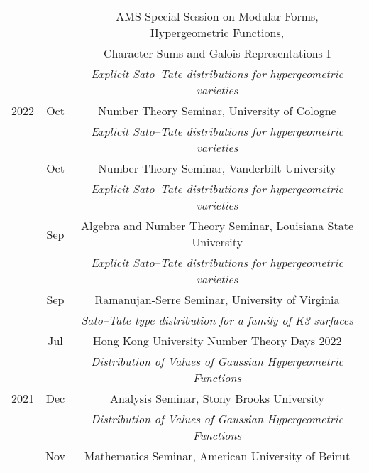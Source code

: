 \documentclass[11pt]{amsart}
\theoremstyle{remark}
\begin{document}
{\begin{tabular}{ c c c }
     &      & \hspace{-0.9in}AMS Special Session on Modular Forms, Hypergeometric Functions, \\
     &      & \hspace{-2.5in}Character Sums and Galois Representations I\\
     &      &  \hspace{-1.5in}\textit{Explicit Sato--Tate distributions for hypergeometric varieties} \\
2022 &  Oct & \hspace{-2.38in}Number Theory Seminar, University of Cologne \\
     &      &  \hspace{-1.5in}\textit{Explicit Sato--Tate distributions for hypergeometric varieties} \\
     &  Oct & \hspace{-2.38in}Number Theory Seminar, Vanderbilt University \\
     &      &  \hspace{-1.5in}\textit{Explicit Sato--Tate distributions for hypergeometric varieties} \\
     & Sep  & \hspace{-1.15in} Algebra and Number Theory Seminar, Louisiana State University \\
     &      & \hspace{-1.5in}\textit{Explicit Sato--Tate distributions for hypergeometric varieties} \\
     & Sep  & \hspace{-2.3in}Ramanujan-Serre Seminar, University of Virginia \\
     &      & \hspace{-1.9in}\textit{Sato--Tate type distribution for a family of K3 surfaces} \\
     & Jul  & \hspace{-2.2in}Hong Kong University Number Theory Days 2022 \\
     &      & \hspace{-1.4in}\textit{Distribution of Values of Gaussian Hypergeometric Functions}\\
2021 & Dec  & \hspace{-2.8in} Analysis Seminar, Stony Brooks University \\
     &      & \hspace{-1.42in}\textit{Distribution of Values of Gaussian Hypergeometric Functions} \\
     &  Nov & \hspace{-2in}Mathematics Seminar, American University of Beirut \\

\end{tabular}}
\end{document}
